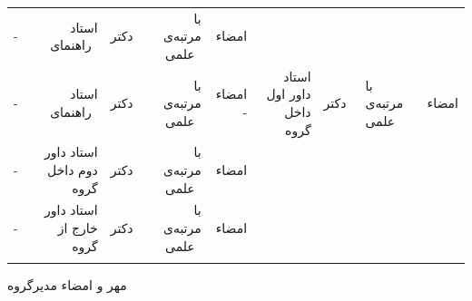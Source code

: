 {{{			\noindent
			\begin{tabular}{rrrrrr}
				\RowNumberFa - &
				استاد راهنمای~\@ThesisTypeFa & دکتر~\@FirstSupervisorFa & با مرتبه‌ی علمی~\textbf{\@FirstSupervisorAcademicRank} & امضاء
				\\[1cm]
				\ifx\ST@SecondSupervisorFa\undefined \else
				\RowNumberFa - &
				استاد راهنمای~\@ThesisTypeFa & دکتر~\@SecondSupervisorFa & با مرتبه‌ی علمی~\textbf{\@SecondSupervisorAcademicRank} &   امضاء
				\fi
				\ifx\ST@SecondAdvisorFa\undefined \else
				\fi
				\ifx\ST@FirstExaminerFa\undefined \else
				\RowNumberFa - &
				استاد داور اول داخل گروه  & دکتر‍~\ST@FirstExaminerFa & با مرتبه‌ی علمی~\textbf{\@FirstExaminerAcademicRank} & امضاء
				\\[1cm]
				\fi
				\ifx\ST@SecondExaminerFa\undefined \else
				\RowNumberFa - &
				استاد داور دوم داخل گروه  & دکتر‍~\ST@SecondExaminerFa & با مرتبه‌ی علمی~\textbf{\@SecondExaminerAcademicRank} & امضاء
				\\[1cm]
				\fi
				\ifx\ST@ThirdExaminerFa\undefined \else
				\RowNumberFa - &
				استاد داور خارج از گروه  & دکتر‍~\ST@ThirdExaminerFa & با مرتبه‌ی علمی~\textbf{\@ThirdExaminerAcademicRank} & امضاء
				\\[1cm]
				\fi
				
			\end{tabular}
		}
	}
	
	\vspace{1.5cm}
	\hfill{مهر و امضاء مدیرگروه}
	\restoregeometry
}

\makeatother

%
%


